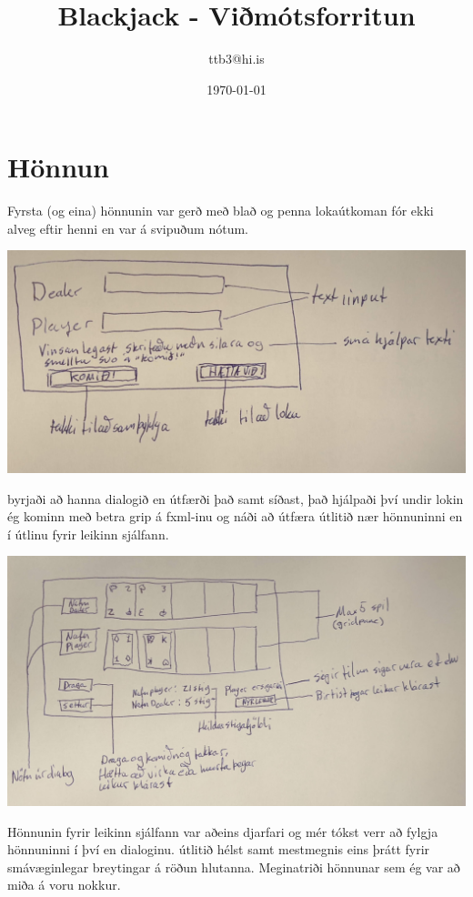 \documentclass{article}
\title{Blackjack - Viðmótsforritun}
\author{ttb3@hi.is}
\date{\today}
\begin{document}
\maketitle


\section*{Hönnun}
Fyrsta (og eina) hönnunin var gerð með blað og penna lokaútkoman fór ekki alveg eftir henni en var á svipuðum nótum.
\begin{center}
    \includegraphics[scale=0.12]{sketch1.jpg}
\end{center}
byrjaði að hanna dialogið en útfærði það samt síðast, það hjálpaði því undir lokin ég kominn með betra grip á fxml-inu og náði að útfæra útlitið nær hönnuninni en í útlinu fyrir leikinn sjálfann.
\newpage
\begin{center}
    \includegraphics[scale=0.1]{sketch2.jpg}
\end{center}
Hönnunin fyrir leikinn sjálfann var aðeins djarfari og mér tókst verr að fylgja hönnuninni í því en dialoginu. útlitið hélst samt mestmegnis eins þrátt fyrir smávæginlegar breytingar á röðun hlutanna.
Meginatriði hönnunar sem ég var að miða á voru  nokkur. 
\end{document}
